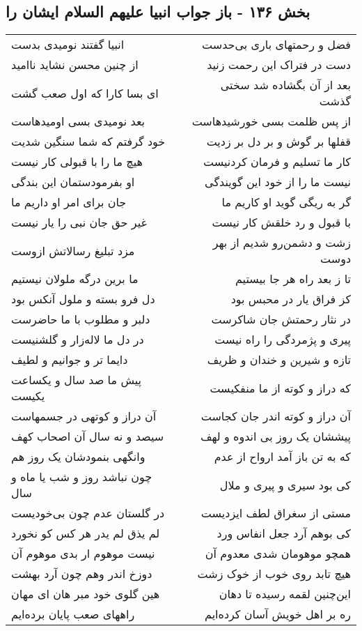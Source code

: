 \begin{center}
\section*{بخش ۱۳۶ - باز جواب انبیا علیهم السلام ایشان را}
\label{sec:sh136}
\begin{longtable}{l p{0.5cm} r}
انبیا گفتند نومیدی بدست
&&
فضل و رحمتهای باری بی‌حدست
\\
از چنین محسن نشاید ناامید
&&
دست در فتراک این رحمت زنید
\\
ای بسا کارا که اول صعب گشت
&&
بعد از آن بگشاده شد سختی گذشت
\\
بعد نومیدی بسی اومیدهاست
&&
از پس ظلمت بسی خورشیدهاست
\\
خود گرفتم که شما سنگین شدیت
&&
قفلها بر گوش و بر دل بر زدیت
\\
هیچ ما را با قبولی کار نیست
&&
کار ما تسلیم و فرمان کردنیست
\\
او بفرمودستمان این بندگی
&&
نیست ما را از خود این گویندگی
\\
جان برای امر او داریم ما
&&
گر به ریگی گوید او کاریم ما
\\
غیر حق جان نبی را یار نیست
&&
با قبول و رد خلقش کار نیست
\\
مزد تبلیغ رسالاتش ازوست
&&
زشت و دشمن‌رو شدیم از بهر دوست
\\
ما برین درگه ملولان نیستیم
&&
تا ز بعد راه هر جا بیستیم
\\
دل فرو بسته و ملول آنکس بود
&&
کز فراق یار در محبس بود
\\
دلبر و مطلوب با ما حاضرست
&&
در نثار رحمتش جان شاکرست
\\
در دل ما لاله‌زار و گلشنیست
&&
پیری و پژمردگی را راه نیست
\\
دایما تر و جوانیم و لطیف
&&
تازه و شیرین و خندان و ظریف
\\
پیش ما صد سال و یکساعت یکیست
&&
که دراز و کوته از ما منفکیست
\\
آن دراز و کوتهی در جسمهاست
&&
آن دراز و کوته اندر جان کجاست
\\
سیصد و نه سال آن اصحاب کهف
&&
پیششان یک روز بی اندوه و لهف
\\
وانگهی بنمودشان یک روز هم
&&
که به تن باز آمد ارواح از عدم
\\
چون نباشد روز و شب یا ماه و سال
&&
کی بود سیری و پیری و ملال
\\
در گلستان عدم چون بی‌خودیست
&&
مستی از سغراق لطف ایزدیست
\\
لم یذق لم یدر هر کس کو نخورد
&&
کی بوهم آرد جعل انفاس ورد
\\
نیست موهوم ار بدی موهوم آن
&&
همچو موهومان شدی معدوم آن
\\
دوزخ اندر وهم چون آرد بهشت
&&
هیچ تابد روی خوب از خوک زشت
\\
هین گلوی خود مبر هان ای مهان
&&
این‌چنین لقمه رسیده تا دهان
\\
راههای صعب پایان برده‌ایم
&&
ره بر اهل خویش آسان کرده‌ایم
\\
\end{longtable}
\end{center}
